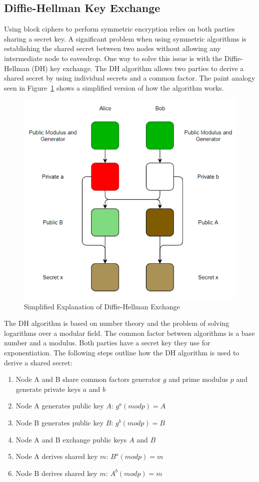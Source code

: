 \documentclass[journal]{IEEEtran}
\begin{document}
\subsection{Diffie-Hellman Key Exchange}
Using block ciphers to perform symmetric encryption relies on both parties sharing a secret key. A significant problem when using symmetric algorithms is establishing the shared secret between two nodes without allowing any intermediate node to eavesdrop. One way to solve this issue is with the Diffie-Hellman (DH) key exchange. The DH algorithm allows two parties to derive a shared secret by using individual secrets and a common factor. The paint analogy seen in Figure~\ref{fig:diffie-hellman-paint} shows a simplified version of how the algorithm works.
\begin{figure}[!htb]
\centerline{\includegraphics[totalheight=6cm]{pictures/diffie-hellman-paint.png}}
    \caption{Simplified Explanation of Diffie-Hellman Exchange}
    \label{fig:diffie-hellman-paint}
\end{figure}
The DH algorithm is based on number theory and the problem of solving logarithms over a modular field. The common factor between algorithms is a base number and a modulus. Both parties have a secret key they use for exponentiation. The following steps outline how the DH algorithm is used to derive a shared secret:
\begin{enumerate}
        \item Node A and B share common factors generator $g$ and prime modulus $p$ and generate private keys $a$ and $b$
        \item Node A generates public key $A$: $g^a(modp) = A$
        \item Node B generates public key $B$: $g^b(modp) = B$
        \item Node A and B exchange public keys $A$ and $B$
        \item Node A derives shared key $m$: $B^a(modp) = m$
        \item Node B derives shared key $m$: $A^b(modp) = m$
\end{enumerate}
\end{document}
